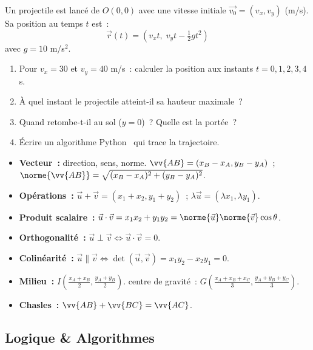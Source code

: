 \begin{challenge}
Un projectile est lanc\'e de $O(0,0)$ avec une vitesse initiale
$\vec{v_0} = (v_x, v_y)$ (m/s). Sa position au temps $t$ est~:
$$\vec{r}(t) = (v_x t,\; v_y t - \tfrac{1}{2}gt^2)$$
avec $g = 10$ m/s$^2$.
\begin{enumerate}
  \item Pour $v_x = 30$ et $v_y = 40$ m/s~:
        calculer la position aux instants $t=0, 1, 2, 3, 4$ s.
  \item \`A quel instant le projectile atteint-il sa hauteur maximale~?
  \item Quand retombe-t-il au sol ($y=0$)~? Quelle est la port\'ee~?
  \item \'Ecrire un algorithme Python \computer\ qui trace la trajectoire.
\end{enumerate}
\end{challenge}

\begin{bilan}
\begin{itemize}
  \item \textbf{Vecteur~:} direction, sens, norme.
        $\vv{AB}=(x_B-x_A, y_B-y_A)$~;
        $\norme{\vv{AB}}=\sqrt{(x_B-x_A)^2+(y_B-y_A)^2}$.
  \item \textbf{Op\'erations~:} $\vec{u}+\vec{v}=(x_1+x_2,y_1+y_2)$~;
        $\lambda\vec{u}=(\lambda x_1,\lambda y_1)$.
  \item \textbf{Produit scalaire~:}
        $\vec{u}\cdot\vec{v}=x_1x_2+y_1y_2=\norme{\vec{u}}\norme{\vec{v}}\cos\theta$.
  \item \textbf{Orthogonalit\'e~:} $\vec{u}\perp\vec{v}\Leftrightarrow\vec{u}\cdot\vec{v}=0$.
  \item \textbf{Colin\'earit\'e~:} $\vec{u}\parallel\vec{v}
        \Leftrightarrow\det(\vec{u},\vec{v})=x_1y_2-x_2y_1=0$.
  \item \textbf{Milieu~:} $I\!\left(\frac{x_A+x_B}{2},\frac{y_A+y_B}{2}\right)$.
        centre de gravité~: $G\!\left(\frac{x_A+x_B+x_C}{3},\frac{y_A+y_B+y_C}{3}\right)$.
  \item \textbf{Chasles~:} $\vv{AB}+\vv{BC}=\vv{AC}$.
\end{itemize}
\end{bilan}

\subsection*{Logique \& Algorithmes}

